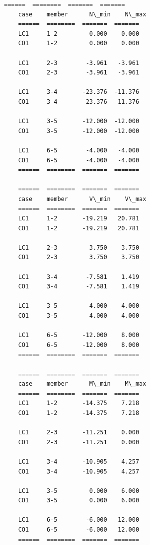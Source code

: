         \begin{Verbatim}[commandchars=\\\{\}]
    ======  ========  =======  =======
    case    member      N\_min    N\_max
    ======  ========  =======  =======
    LC1     1-2         0.000    0.000
    CO1     1-2         0.000    0.000
    
    LC1     2-3        -3.961   -3.961
    CO1     2-3        -3.961   -3.961
    
    LC1     3-4       -23.376  -11.376
    CO1     3-4       -23.376  -11.376

    LC1     3-5       -12.000  -12.000
    CO1     3-5       -12.000  -12.000
    
    LC1     6-5        -4.000   -4.000
    CO1     6-5        -4.000   -4.000
    ======  ========  =======  =======

    ======  ========  =======  =======
    case    member      V\_min    V\_max
    ======  ========  =======  =======
    LC1     1-2       -19.219   20.781
    CO1     1-2       -19.219   20.781
    
    LC1     2-3         3.750    3.750
    CO1     2-3         3.750    3.750

    LC1     3-4        -7.581    1.419
    CO1     3-4        -7.581    1.419
    
    LC1     3-5         4.000    4.000
    CO1     3-5         4.000    4.000
    
    LC1     6-5       -12.000    8.000
    CO1     6-5       -12.000    8.000
    ======  ========  =======  =======

    ======  ========  =======  =======
    case    member      M\_min    M\_max
    ======  ========  =======  =======
    LC1     1-2       -14.375    7.218
    CO1     1-2       -14.375    7.218
    
    LC1     2-3       -11.251    0.000
    CO1     2-3       -11.251    0.000

    LC1     3-4       -10.905    4.257
    CO1     3-4       -10.905    4.257
    
    LC1     3-5         0.000    6.000
    CO1     3-5         0.000    6.000
    
    LC1     6-5        -6.000   12.000
    CO1     6-5        -6.000   12.000
    ======  ========  =======  =======
        \end{Verbatim}

